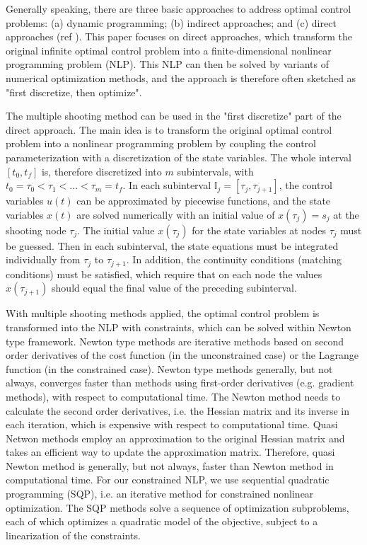 \documentclass  [
  paper    = a4,
  BCOR     = 10mm,
  twoside,
  fontsize = 12pt,
  fleqn,
  toc      = bibnumbered,
  toc      = listofnumbered,
  numbers  = noendperiod,
  headings = normal,
  listof   = leveldown,
  version  = 3.03
]                                       {scrreprt}
\newcommand{\<}{\langle}
\renewcommand{\>}{\rangle}
\begin{document}
Generally speaking, there are three basic approaches to address optimal control problems: (a) dynamic programming; (b) indirect approaches; and (c) direct approaches (ref \cite{MHHP05}). This paper focuses on direct approaches, which transform the original infinite optimal control problem into a finite-dimensional nonlinear programming problem (NLP). This NLP can then be solved by variants of numerical optimization methods, and the approach is therefore often sketched as "first discretize, then optimize".

The multiple shooting method can be used in the "first discretize" part of the direct approach. The main idea is to transform the original optimal control problem into a nonlinear programming problem by coupling the control parameterization with a discretization of the state variables. The whole interval $[t_0, t_f]$ is, therefore discretized into $m$ subintervals, with $t_0 = \tau_0 < \tau_1 < ... < \tau_m = t_f$. In each subinterval $\mathbb{I}_j = [\tau_{j}, \tau_{j+1}]$, the control variables $u(t)$ can be approximated by piecewise functions, and the state variables $x(t)$ are solved numerically with an initial value of $x(\tau_j)=s_j$ at the shooting node $\tau_j$. The initial value $x(\tau_j)$ for the state variables at nodes $\tau_j$ must be guessed. Then in each subinterval, the state equations must be integrated individually from $\tau_j$ to $\tau_{j+1}$. In addition, the continuity conditions (matching conditions) must be satisfied, which require that on each node the values $x(\tau_{j+1})$ should equal the final value of the preceding subinterval.

With multiple shooting methods applied, the optimal control problem is transformed into the NLP with constraints, which can be solved within Newton type framework. Newton type methods are iterative methods based on second order derivatives of the cost function (in the unconstrained case) or the Lagrange function (in the constrained case). Newton type methods generally, but not always, converges faster than methods using first-order derivatives (e.g. gradient methods), with respect to computational time. The Newton method needs to calculate the second order derivatives, i.e. the Hessian matrix and its inverse in each iteration, which is expensive with respect to computational time. Quasi Netwon methods employ an approximation to the original Hessian matrix and takes an efficient way to update the approximation matrix. Therefore, quasi Newton method is generally, but not always, faster than Newton method in computational time. For our constrained NLP, we use sequential quadratic programming (SQP), i.e. an iterative method for constrained nonlinear optimization. The SQP methods solve a sequence of optimization subproblems, each of which optimizes a quadratic model of the objective, subject to a linearization of the constraints.
\end{document}
